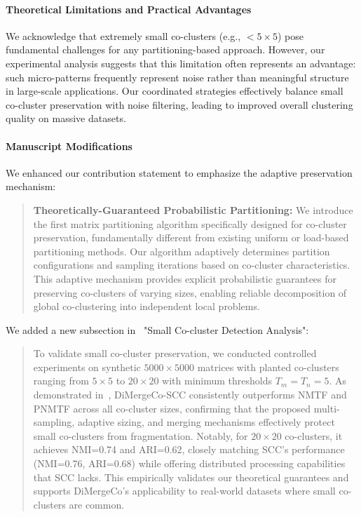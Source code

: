 \documentclass{ar2rc}
\theoremstyle{definition}
\theoremstyle{remark} %
\begin{document}
\paragraph{Theoretical Limitations and Practical Advantages}
We acknowledge that extremely small co-clusters (e.g., $< 5 \times 5$) pose fundamental challenges for any partitioning-based approach. However, our experimental analysis suggests that this limitation often represents an advantage: such micro-patterns frequently represent noise rather than meaningful structure in large-scale applications. Our coordinated strategies effectively balance small co-cluster preservation with noise filtering, leading to improved overall clustering quality on massive datasets.

\paragraph{Manuscript Modifications}

We enhanced our contribution statement to emphasize the adaptive preservation mechanism:

\begin{quote}
  \textbf{Theoretically-Guaranteed Probabilistic Partitioning:} We introduce the first matrix partitioning algorithm specifically designed for co-cluster preservation, fundamentally different from existing uniform or load-based partitioning methods. Our algorithm adaptively determines partition configurations and sampling iterations based on co-cluster characteristics. This adaptive mechanism provides explicit probabilistic guarantees for preserving co-clusters of varying sizes, enabling reliable decomposition of global co-clustering into independent local problems.
\end{quote}

We added a new subsection in~ "Small Co-cluster Detection Analysis":

\begin{quote}
  To validate small co-cluster preservation, we conducted controlled experiments on synthetic $5000 \times 5000$ matrices with planted co-clusters ranging from $5 \times 5$ to $20 \times 20$ with minimum thresholds $T_m = T_n = 5$. As demonstrated in~, DiMergeCo-SCC consistently outperforms NMTF and PNMTF across all co-cluster sizes, confirming that the proposed multi-sampling, adaptive sizing, and merging mechanisms effectively protect small co-clusters from fragmentation. Notably, for $20 \times 20$ co-clusters, it achieves NMI=0.74 and ARI=0.62, closely matching SCC's performance (NMI=0.76, ARI=0.68) while offering distributed processing capabilities that SCC lacks. This empirically validates our theoretical guarantees and supports DiMergeCo's applicability to real-world datasets where small co-clusters are common.
\end{quote}
\end{document}
